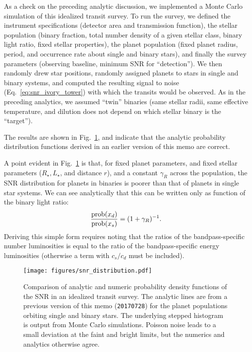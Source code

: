 \documentclass{emulateapj}
\begin{document}
As a check on the preceding analytic discussion, we implemented a Monte Carlo 
simulation of this idealized transit survey.
To run the survey, we defined the instrument specifications (detector area and 
transmission function), the stellar population (binary fraction, total number 
density of a given stellar class, binary light ratio, fixed stellar 
properties), the planet population (fixed planet radius, period, and occurrence 
rate about single and binary stars), and finally the survey parameters 
(observing baseline, minimum SNR for ``detection'').
We then randomly drew star positions, randomly assigned planets to stars in 
single and binary systems, and computed the resulting signal to noise 
(Eq.~\ref{eq:snr_ivory_tower}) with which 
the transits would be observed.
As in the preceding analytics, we assumed ``twin'' binaries (same stellar 
radii, same effective temperature, and dilution does not depend on which 
stellar binary is the ``target'').

The results are shown in Fig.~\ref{fig:snr_dist_analytic_v_numeric}, and 
indicate that the analytic probability distribution functions derived in an 
earlier version of this memo are correct.

A point evident in Fig.~\ref{fig:snr_dist_analytic_v_numeric} is that, for 
fixed planet parameters, and fixed stellar parameters ($R_\star, L_\star$, and 
distance $r$), and a constant $\gamma_R$ across the population, the SNR 
distribution for planets in binaries is poorer than that of planets in single 
star systems.
We can see analytically that this can be written only as function of the 
binary light ratio:
\begin{equation}
\frac{{\rm prob}(x_d)}{{\rm prob}(x_s)} =(1 + \gamma_R)^{-1}.
\end{equation}
Deriving this simple form requires noting that the ratios of the 
bandpass-specific number luminosities is equal to the ratio 
of the bandpass-specific energy luminosities (otherwise a term with $c_s/c_d$ 
must be included).

\begin{figure}[!t]
	\begin{center}
		\texttt{[image: figures/snr\_distribution.pdf]}
	\end{center}
	\caption{Comparison of analytic and numeric probability 
	density functions of the SNR in an idealized transit survey.
	The analytic lines are from a previous version of this memo 
	(\texttt{20170728}) for the planet populations orbiting single and binary 
	stars. The underlying stepped histogram is output from Monte Carlo 
	simulations. Poisson noise leads to a small deviation at the faint and 
	bright limits, but the numerics and analytics otherwise agree.
		 }
	\label{fig:snr_dist_analytic_v_numeric}
\end{figure}
\end{document}
